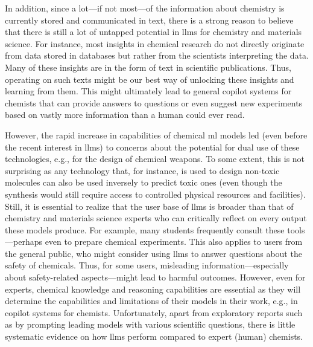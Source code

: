 \documentclass[11pt, oneside]{article}
\begin{document}
\begin{refsegment}
In addition, since a lot---if not most---of the information about chemistry is currently stored and communicated in text, there is a strong reason to believe that there is still a lot of untapped potential in \glspl{llm} for chemistry and materials science.\autocite{miret2024llms}
For instance, most insights in chemical research do not directly originate from data stored in databases but rather from the scientists interpreting the data.
Many of these insights are in the form of text in scientific publications.
Thus, operating on such texts might be our best way of unlocking these insights and learning from them.
This might ultimately lead to general copilot systems for chemists that can provide answers to questions or even suggest new experiments based on vastly more information than a human could ever read.

However, the rapid increase in capabilities of chemical \gls{ml} models led (even before the recent interest in \glspl{llm}) to concerns about the potential for dual use of these technologies, e.g., for the design of chemical weapons.\autocite{gopal2023releasing, ganguli2022red, Urbina_2022, campbell2023censoring, moulange2023towards, urbina2022teachable}
To some extent, this is not surprising as any technology that, for instance, is used to design non-toxic molecules can also be used inversely to predict toxic ones (even though the synthesis would still require access to controlled physical resources and facilities).
Still, it is essential to realize that the user base of \glspl{llm} is broader than that of chemistry and materials science experts who can critically reflect on every output these models produce.
For example, many students frequently consult these tools---perhaps even to prepare chemical experiments.\autocite{Intelligent.com_2023}
This also applies to users from the general public, who might consider using \glspl{llm} to answer questions about the safety of chemicals.
Thus, for some users, misleading information---especially about safety-related aspects---might lead to harmful outcomes.
However, even for experts, chemical knowledge and reasoning capabilities are essential as they will determine the capabilities and limitations of their models in their work, e.g., in copilot systems for chemists.
Unfortunately, apart from exploratory reports such as by prompting leading models with various scientific questions,\autocite{ai4science2023impact} there is little systematic evidence on how \glspl{llm} perform compared to expert (human) chemists.


\end{refsegment}
\end{document}

